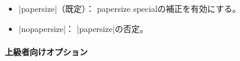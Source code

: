 \documentclass[uplatex,dvipdfmx,a4paper]{jsarticle}
\newcommand{\Note}{\par\noindent ※}
\newcommand{\Means}{：\quad}
\begin{document}
\begin{itemize}
  \Note ドライバが|dvips|の場合は既定で|convbkmk|が有効になる。
  これにより元の既定値|tounicode|は実質的に
  \footnote{|tounicode|の説明中の項目1の機能はdvipsでは効果がなく、
    また項目2の機能は上書きされるため。}%
  無効化される。
\item |papersize|（既定）\Means
  papersize specialの補正を有効にする。
\item |nopapersize|\Means
  |papersize|の否定。
\end{itemize}

\paragraph{上級者向けオプション}\mbox{}
\end{document}
